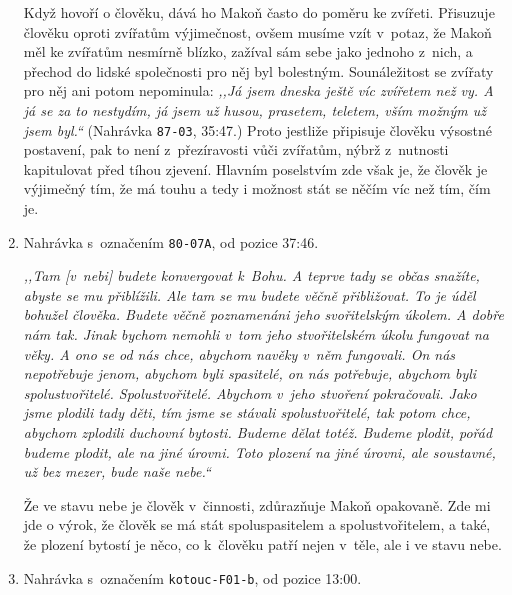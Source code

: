 \begin{enumerate}
{Když hovoří o člověku, dává ho Makoň často do poměru ke zvířeti. Přisuzuje
člověku oproti zvířatům výjimečnost, ovšem musíme vzít v~potaz, že Makoň měl ke
zvířatům nesmírně blízko, zažíval sám sebe jako jednoho z~nich, a přechod do
lidské společnosti pro něj byl bolestným.\cite{KaMaUZ} Sounáležitost se zvířaty
pro něj ani potom nepominula: \textit{,,Já jsem dneska ještě víc zvířetem než vy. A já
se za to nestydím, já jsem už husou, prasetem, teletem, vším možným už jsem
byl.``} (Nahrávka \texttt{87-03}, 35:47.) Proto jestliže připisuje člověku
výsostné postavení, pak to není z~přezíravosti vůči zvířatům, nýbrž z~nutnosti
kapitulovat před tíhou zjevení.
Hlavním poselstvím zde však je, že člověk je výjimečný tím, že má touhu a tedy i
možnost stát se něčím víc než tím, čím je.

}

\item{
Nahrávka s~označením \texttt{80-07A}, od pozice 37:46.

\textit{%
,,Tam [v~nebi] budete konvergovat k~Bohu. A teprve tady se občas snažíte, abyste se mu
přiblížili. Ale tam se mu budete věčně přibližovat. To je úděl bohužel člověka.
Budete věčně poznamenáni jeho svořitelským úkolem. A dobře nám tak. Jinak bychom
nemohli v~tom jeho stvořitelském úkolu fungovat na věky. A ono se od nás chce,
abychom navěky v~něm fungovali. On nás nepotřebuje jenom, abychom byli
spasitelé, on nás potřebuje, abychom byli spolustvořitelé. Spolustvořitelé.
Abychom v~jeho stvoření pokračovali. Jako jsme plodili tady děti, tím jsme se
stávali spolustvořitelé, tak potom chce, abychom zplodili duchovní bytosti.
Budeme dělat totéž. Budeme plodit, pořád budeme plodit, ale na jiné úrovni. Toto
plození na jiné úrovni, ale soustavné, už bez mezer, bude naše nebe.``
}

Že ve stavu nebe je člověk v~činnosti, zdůrazňuje Makoň opakovaně. Zde mi jde o
výrok, že člověk se má stát spoluspasitelem a spolustvořitelem, a také, že
plození bytostí je něco, co k~člověku patří nejen v~těle, ale i ve stavu nebe.

}

\item{
Nahrávka s~označením \texttt{kotouc-F01-b}, od pozice 13:00.

}
\end{enumerate}
